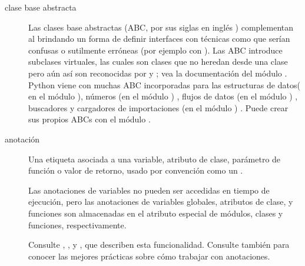 \documentclass[a4,10pt,spanish]{sphinxmanual}
\begin{document}
\begin{description}
\item[{clase base abstracta\label{\detokenize{glossary:term-abstract-base-class}}}] \leavevmode
\sphinxAtStartPar
Las clases base abstractas (ABC, por sus siglas en inglés ) complementan al {\hyperref[\detokenize{glossary:term-duck-typing}]{}} brindando un forma de definir interfaces con técnicas como  que serían confusas o sutilmente erróneas (por ejemplo con ). Las ABC introduce subclases virtuales, las cuales son clases que no heredan desde una clase pero aún así son reconocidas por  y ; vea la documentación del módulo . Python viene con muchas ABC incorporadas para las estructuras de datos( en el módulo ), números (en el módulo  ) , flujos de datos (en el módulo  ) , buscadores y cargadores de importaciones (en el módulo  ) . Puede crear sus propios ABCs con el módulo .

\item[{anotación\label{\detokenize{glossary:term-annotation}}}] \leavevmode
\sphinxAtStartPar
Una etiqueta asociada a una variable, atributo de clase, parámetro de función o valor de retorno, usado por convención como un {\hyperref[\detokenize{glossary:term-type-hint}]{}}.

\sphinxAtStartPar
Las anotaciones de variables no pueden ser accedidas en tiempo de ejecución, pero las anotaciones de variables globales, atributos de clase, y funciones son almacenadas en el atributo especial  de módulos, clases y funciones, respectivamente.

\sphinxAtStartPar
Consulte {\hyperref[\detokenize{glossary:term-variable-annotation}]{}}, {\hyperref[\detokenize{glossary:term-function-annotation}]{}},  y , que describen esta funcionalidad. Consulte también  para conocer las mejores prácticas sobre cómo trabajar con anotaciones.


\end{description}
\end{document}
